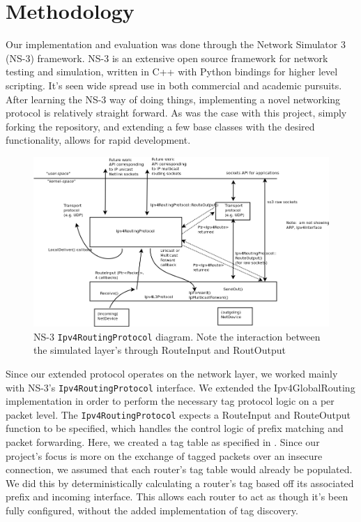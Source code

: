 \documentclass[12pt]{article} %
\newcommand{\prettycode}[1]
{\lstinline[basicstyle=\ttfamily]{#1}}
\begin{document}
\section{Methodology}

Our implementation and evaluation was done through the Network Simulator 3 (NS-3) framework. NS-3 is an extensive open source framework for network testing and simulation, written in C++ with Python bindings for higher level scripting. It's seen wide spread use in both commercial and academic pursuits. After learning the NS-3 way of doing things, implementing a novel networking protocol is relatively straight forward. As was the case with this project, simply forking the repository, and extending a few base classes with the desired functionality, allows for rapid development.

\begin{figure}[ht!]
\includegraphics[width=160mm]{routing.png}
\caption{NS-3 \prettycode{Ipv4RoutingProtocol} diagram. Note the interaction between the simulated layer's through RouteInput and RoutOutput\cite{ns-3-routing}}
\end{figure}

Since our extended protocol operates on the network layer, we worked mainly with NS-3's \prettycode{Ipv4RoutingProtocol} interface. We extended the Ipv4GlobalRouting implementation in order to perform the necessary tag protocol logic on a per packet level. The \prettycode{Ipv4RoutingProtocol} expects a RouteInput and RouteOutput function to be specified, which handles the control logic of prefix matching and packet forwarding. Here, we created a tag table as specified in \cite{Shue20081567}. Since our project's focus is more on the exchange of tagged packets over an insecure connection, we assumed that each router's tag table would already be populated. We did this by deterministically calculating a router's tag based off its associated prefix and incoming interface. This allows each router to act as though it's been fully configured, without the added implementation of tag discovery. 
\end{document}
